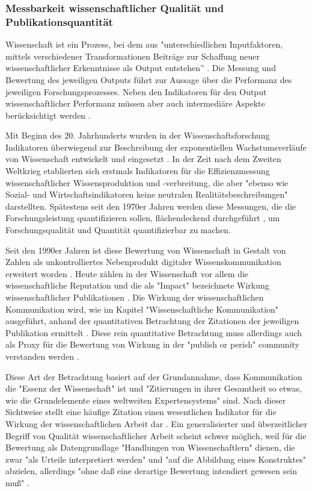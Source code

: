 \subsubsection{Messbarkeit wissenschaftlicher Qualität und Publikationsquantität}

Wissenschaft ist ein Prozess, bei dem aus "unterschiedlichen Inputfaktoren, mittels verschiedener Transformationen Beiträge zur Schaffung neuer wissenschaftlicher Erkenntnisse als Output entstehen” \cite[:125]{Jansen_2007}. Die Messung und Bewertung des jeweiligen Outputs führt zur Aussage über die Performanz des jeweiligen Forschungsprozesses. Neben den Indikatoren für den Output wissenschaftlicher Performanz müssen aber auch intermediäre Aspekte berücksichtigt werden \cite[:38]{Schmoch_2009}.

Mit Beginn des 20. Jahrhunderts wurden in der Wissenschaftsforschung Indikatoren überwiegend zur Beschreibung der exponentiellen Wachstumsverläufe von Wissenschaft entwickelt und eingesetzt \cite[:182]{Hornbostel_1997} \cite{Rescher_1978}. In der Zeit nach dem Zweiten Weltkrieg etablierten sich erstmals Indikatoren für die Effizienzmessung wissenschaftlicher Wissensproduktion und -verbreitung, die aber "ebenso wie Sozial- und Wirtschaftsindikatoren keine neutralen Realitätsbeschreibungen" \cite[:181]{Hornbostel_1997} darstellten. Spätestens seit den 1970er Jahren werden diese Messungen, die die Forschungsleistung quantifizieren sollen, flächendeckend durchgeführt \cite{Hornbostel_1997}, um Forschungsqualität und Quantität quantifizierbar zu machen.

Seit den 1990er Jahren ist diese Bewertung von Wissenschaft in Gestalt von Zahlen als unkontrolliertes Nebenprodukt digitaler Wissenskommunikation erweitert worden \cite[:175]{Angermueller_2010}. Heute zählen in der Wissenschaft vor allem die wissenschaftliche Reputation und die als "Impact" bezeichnete Wirkung wissenschaftlicher Publikationen \cite{Herb_2013} \cite{Hornbostel_1997}. Die Wirkung der wissenschaftlichen Kommunikation wird, wie im Kapitel "Wissenschaftliche Kommunikation" ausgeführt, anhand der quantitativen Betrachtung der Zitationen der jeweiligen Publikation ermittelt \cite{Brembs_2013} \cite[:16]{Haustein_2012} \cite{Weller_2011}. Diese rein quantitative Betrachtung muss allerdings auch als Proxy für die Bewertung von Wirkung in der "publish or perish" community verstanden werden \cite{Peters_2015}.

Diese Art der Betrachtung basiert auf der Grundannahme, dass Kommunikation die "Essenz der Wissenschaft" \cite{Bonitz_1998} ist und "Zitierungen in ihrer Gesamtheit so etwas, wie die Grundelemente eines weltweiten Expertensystems" \cite{Bonitz_1990} sind. Nach dieser Sichtweise stellt eine häufige Zitation einen wesentlichen Indikator für die Wirkung der wissenschaftlichen Arbeit dar \cite{Hamilton_1990}. Ein generalisierter und überzeitlicher Begriff von Qualität wissenschaftlicher Arbeit scheint schwer möglich, weil für die Bewertung als Datengrundlage "Handlungen von Wissenschaftlern" dienen, die zwar "als Urteile interpretiert werden" und "auf die Abbildung eines Konstruktes" abzielen, allerdings "ohne daß eine derartige Bewertung intendiert gewesen sein muß" \cite[:186]{Hornbostel_1997}.

